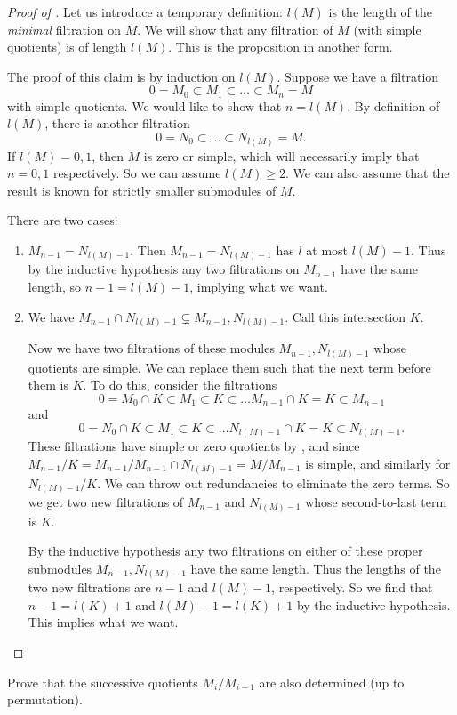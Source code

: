 \begin{proof}[Proof of ] 
Let us introduce a temporary definition: $l(M)$ is the length of the
\emph{minimal} filtration on $M$. We will show that any filtration of $M$ (with
simple quotients) is of length
$l(M)$. This is the proposition in another form.

The proof of this claim is by induction on $l(M)$. Suppose we have a filtration
\[ 0 = M_0 \subset M_1 \subset \dots \subset M_n = M  \]
with simple quotients. We would like to show that $n  = l(M)$. By definition of
$l(M)$, there is another filtration
\[ 0 = N_0 \subset \dots \subset N_{l(M)} = M.  \]
If $l(M) = 0,1$, then $M$ is zero or simple, which will necessarily imply that $n=0,1$
respectively. So we can assume $l(M)  \geq 2$. We can also assume that the
result is known for strictly smaller submodules of $M$.

There are two cases:
\begin{enumerate}
\item $M_{n-1} = N_{l(M) -1 } $. Then $M_{n-1} = N_{l(M)-1}$ has $l$ at most
$l(M)-1$. Thus by the inductive hypothesis any two filtrations on $M_{n-1}$
have the same length, so $n-1 = l(M) -1$, implying what we want. 
\item We have $M_{n-1} \cap N_{l(M) - 1} \subsetneq M_{n-1}, N_{l(M)-1}$. 
Call this intersection $K$. 

Now we have two  filtrations of these modules $M_{n-1}, N_{l(M)-1}$ whose
quotients are simple. We can replace them such that the next
term before them is $K$. 
To do this, consider the filtrations
\[ 0 = M_0 \cap K \subset M_1 \subset K \subset \dots M_{n-1} \cap K = K
\subset M_{n-1}  \]
and
\[ 0 = N_0 \cap K \subset M_1 \subset K \subset \dots N_{l(M)-1} \cap K = K
\subset N_{l(M)-1} . \]
These filtrations have simple or zero quotients by
, and since $ M_{n-1}/K =
M_{n-1}/M_{n-1} \cap N_{l(M)-1} = M/M_{n-1}$ is simple, and similarly for
$N_{l(M)-1}/K$. We can throw out redundancies to eliminate
the zero terms. 
So we get two new filtrations of $M_{n-1}$ and $N_{l(M)-1}$ whose second-to-last
term is $K$.

By the
inductive hypothesis any two filtrations on either of these proper submodules $M_{n-1},
N_{l(M)-1} $
have the same length. 
Thus the lengths of the two new filtrations are $n-1$ and $l(M)-1$,
respectively.
So we find that $n-1 = l(K) +1$ and $l(M)-1 = l(K)+1$ by
the inductive hypothesis. This implies what we want.
\end{enumerate}
\end{proof} 

\begin{exercise} 
Prove that the successive quotients $M_i/M_{i-1}$ are also determined (up to
permutation).
\end{exercise} 


